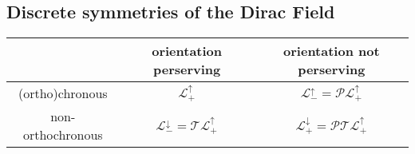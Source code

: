 \documentclass{scrartcl}
\numberwithin{equation}{section}
\begin{document}
\subsection{Discrete symmetries of the Dirac Field}
\begin{center}
\begin{tabular}{c c c}
	\toprule
& orientation perserving & orientation not perserving \\
\midrule
	(ortho)chronous & $\mathcal{L}_+^{\uparrow}$ & $\mathcal{L}_-^\uparrow=\mathcal{P}\mathcal{L}_+^{\uparrow}$ \\
	non-orthochronous & $\mathcal{L}_-^\downarrow = \mathcal{T}\mathcal{L}_+^{\uparrow}$ & $\mathcal{L}_+^{\downarrow}=\mathcal{P}\mathcal{T}\mathcal{L}_+^{\uparrow}$ \\
	\bottomrule
\end{tabular}
\end{center}
\end{document}
